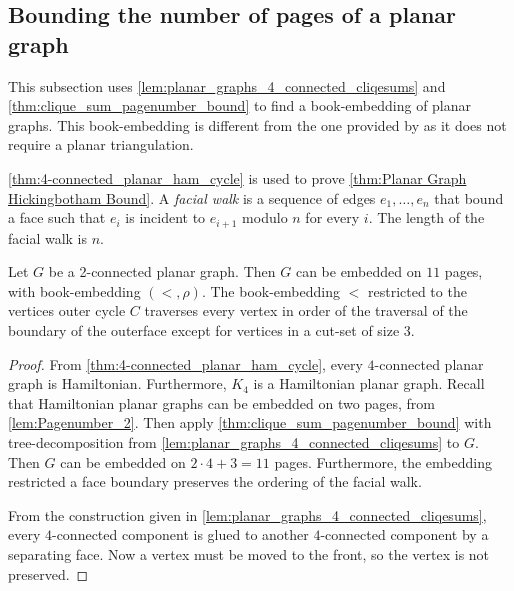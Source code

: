\subsection{Bounding the number of pages of a planar graph}
This subsection uses \cref{lem:planar_graphs_4_connected_cliqesums} and \cref{thm:clique_sum_pagenumber_bound} to find a book-embedding of planar graphs. This book-embedding is different from the one provided by \textcite{yannakakisEmbeddingPlanarGraphs1989} as it does not require a planar triangulation. 


\cref{thm:4-connected_planar_ham_cycle} is used to prove \cref{thm:Planar Graph Hickingbotham Bound}. A \textit{facial walk} is a sequence of edges \(e_1, \ldots, e_n\) that bound a face such that \(e_i\) is incident to \(e_{i + 1}\) modulo \(n\) for every \(i\). The length of the facial walk is \(n\).


\begin{corollary}\label{thm:Planar Graph Hickingbotham Bound}
	Let \(G\) be a 2-connected planar graph. Then $G$ can be embedded on $11$ pages, with book-embedding $(<, \rho)$. The book-embedding $<$ restricted to the vertices outer cycle $C$ traverses every vertex in order of the traversal of the boundary of the outerface except for vertices in a cut-set of size 3.
\end{corollary}
\begin{proof}
	From \cref{thm:4-connected_planar_ham_cycle}, every $4$-connected planar graph is Hamiltonian. Furthermore, $K_4$ is a Hamiltonian planar graph.
	Recall that Hamiltonian planar graphs can be embedded on two pages, from \cref{lem:Pagenumber_2}. 
	Then apply \cref{thm:clique_sum_pagenumber_bound} with tree-decomposition from \cref{lem:planar_graphs_4_connected_cliqesums} to $G$. Then $G$ can be embedded on \(2 \cdot 4 + 3 = 11\) pages. Furthermore, the embedding restricted a face boundary preserves the ordering of the facial walk.

	From the construction given in \cref{lem:planar_graphs_4_connected_cliqesums}, every $4$-connected component is glued to another $4$-connected component by a separating face. Now a vertex must be moved to the front, so the vertex is not preserved. 
\end{proof}

